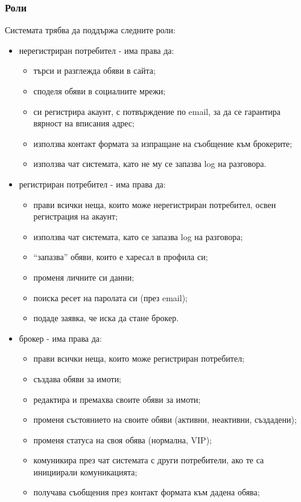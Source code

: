 \documentclass[a4paper]{article}
\begin{document}
\subsubsection{Роли}
Системата трябва да поддържа следните роли:
	\begin{itemize}
	\item {нерегистриран потребител - има права да:
		\begin{itemize}
		\item търси и разглежда обяви в сайта;
		\item споделя обяви в социалните мрежи;
		\item си регистрира акаунт, с потвърждение по email, за да се гарантира вярност на вписания адрес;
		\item използва контакт формата за изпращане на съобщение към брокерите;
		\item използва чат системата, като не му се запазва log на разговора.
		\end{itemize}
	}
	\item {регистриран потребител - има права да:
		\begin{itemize}
		\item прави всички неща, които може нерегистриран потребител, освен регистрация на акаунт;
		\item използва чат системата, като се запазва log на разговора;
		\item ``запазва'' обяви, които е харесал в профила си;
		\item променя личните си данни;
		\item поиска ресет на паролата си (през email);
		\item подаде заявка, че иска да стане брокер.
		\end{itemize}
	}
	\item {брокер - има права да:
		\begin{itemize}
		\item прави всички неща, които може регистриран потребител;
		\item създава обяви за имоти;
		\item редактира и премахва своите обяви за имоти;
		\item променя състоянието на своите обяви (активни, неактивни, създадени);
		\item променя статуса на своя обява (нормална, VIP);
		\item комуникира през чат системата с други потребители, ако те са инициирали комуникацията;
		\item получава съобщения през контакт формата към дадена обява;

\end{itemize}}
\end{itemize}
\end{document}

